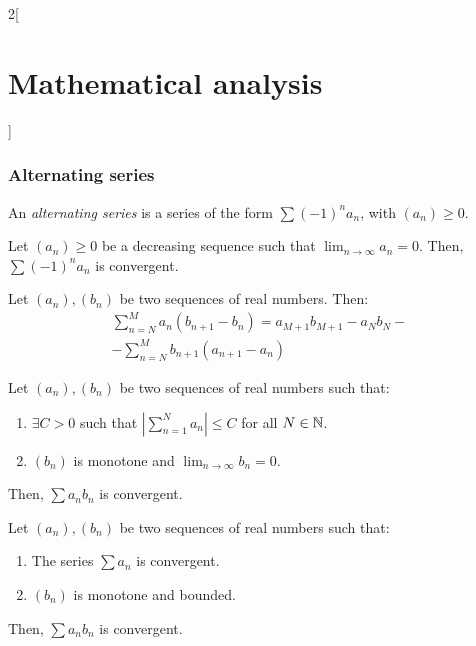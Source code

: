 \documentclass[../../../main_math.tex]{subfiles}
\begin{document}
\begin{multicols}{2}[\section{Mathematical analysis}]
  \subsubsection{Alternating series}
  \begin{definition}
    An \emph{alternating series} is a series of the form $\sum (-1)^na_n$, with $(a_n)\geq 0$.
  \end{definition}
  \begin{theorem}
    Let $(a_n)\geq 0$ be a decreasing sequence such that $\displaystyle\lim_{n\to\infty}a_n=0$. Then, $\sum (-1)^na_n$ is convergent.
  \end{theorem}
  \begin{theorem}
    Let $(a_n),(b_n)$ be two sequences of real numbers. Then:
    \begin{multline*}
      \sum_{n=N}^M a_n(b_{n+1}-b_n)=a_{M+1}b_{M+1}-a_Nb_N-\\
      -\sum_{n=N}^Mb_{n+1}(a_{n+1}-a_n)
    \end{multline*}
  \end{theorem}
  \begin{theorem}
    Let $(a_n),(b_n)$ be two sequences of real numbers such that:
    \begin{enumerate}
      \item $\exists C>0$ such that $\displaystyle\left|\sum_{n=1}^Na_n\right|\leq C$ for all $N\in\mathbb{N} $.
      \item $(b_n)$ is monotone and $\displaystyle\lim_{n\to\infty}b_n=0$.
    \end{enumerate}
    Then, $\sum a_nb_n$ is convergent.
  \end{theorem}
  \begin{theorem}
    Let $(a_n),(b_n)$ be two sequences of real numbers such that:
    \begin{enumerate}
      \item The series $\sum a_n$ is convergent.
      \item $(b_n)$ is monotone and bounded.
    \end{enumerate}
    Then, $\sum a_nb_n$ is convergent.
  \end{theorem}

\end{multicols}
\end{document}
